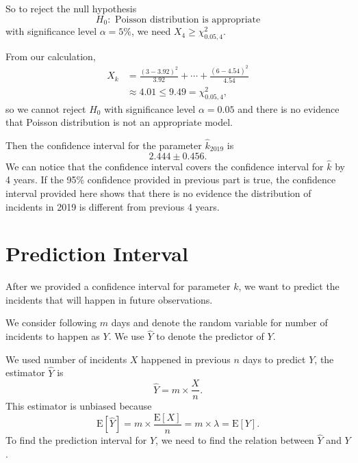 \documentclass[11pt,a4paper,english]{article}
\begin{document}
So to reject the null hypothesis 
\begin{equation*}
	H_{0}:\text{ Poisson distribution is appropriate}
\end{equation*}
with significance level $\alpha = 5\%$, we need $X_{4} \geq \chi^{2}_{0.05,4}$.

From our calculation,
\begin{align*}
	X_{k} &= \frac{(3-3.92)^{2}}{3.92}+\cdots+\frac{(6-4.54)^{2}}{4.54}\\
	&\approx 4.01 \leq 9.49  = \chi^{2}_{0.05,4},
\end{align*}
so we cannot reject $H_{0}$ with significance level $\alpha = 0.05$ and there is no evidence that Poisson distribution is not an appropriate model.

Then the confidence interval for the parameter $\hat{k}_{2019}$ is 
\begin{equation*}
	2.444 \pm 0.456.
\end{equation*}
We can notice that the confidence interval covers the confidence interval for $\hat{k}$ by 4 years. If the 95\% confidence provided in previous part is true, the confidence interval provided here shows that there is no evidence the distribution of incidents in 2019 is different from previous 4 years. 
\section{Prediction Interval}
After we provided a confidence interval for parameter $k$, we want to predict the incidents that will happen in future observations.

We consider following $m$ days and denote the random variable for number of incidents to happen as $Y$. We use $\hat{Y}$ to denote the predictor of $Y$.

We used number of incidents $X$ happened in previous $n$ days to predict $Y$, the estimator $\hat{Y}$ is 
\begin{equation*}
\hat{Y} = m \times \frac{X}{n}.
\end{equation*}
This estimator is unbiased because 
\begin{equation*}
	\text{E}[\hat{Y}] = m \times \frac{\text{E}[X]}{n} = m \times \lambda = \text{E}[Y].
\end{equation*}
To find the prediction interval for $Y$, we need to find the relation between $\hat{Y}$ and $Y$.
\end{document}
